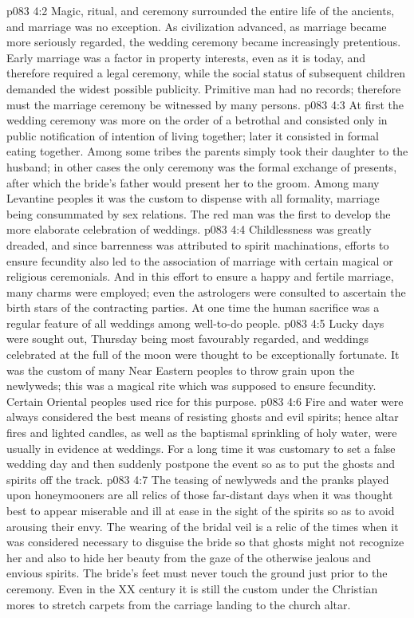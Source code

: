 \vs p083 4:2 \pc Magic, ritual, and ceremony surrounded the entire life of the ancients, and marriage was no exception. As civilization advanced, as marriage became more seriously regarded, the wedding ceremony became increasingly pretentious. Early marriage was a factor in property interests, even as it is today, and therefore required a legal ceremony, while the social status of subsequent children demanded the widest possible publicity. Primitive man had no records; therefore must the marriage ceremony be witnessed by many persons.
\vs p083 4:3 At first the wedding ceremony was more on the order of a betrothal and consisted only in public notification of intention of living together; later it consisted in formal eating together. Among some tribes the parents simply took their daughter to the husband; in other cases the only ceremony was the formal exchange of presents, after which the bride’s father would present her to the groom. Among many Levantine peoples it was the custom to dispense with all formality, marriage being consummated by sex relations. The red man was the first to develop the more elaborate celebration of weddings.
\vs p083 4:4 \pc Childlessness was greatly dreaded, and since barrenness was attributed to spirit machinations, efforts to ensure fecundity also led to the association of marriage with certain magical or religious ceremonials. And in this effort to ensure a happy and fertile marriage, many charms were employed; even the astrologers were consulted to ascertain the birth stars of the contracting parties. At one time the human sacrifice was a regular feature of all weddings among well\hyp{}to\hyp{}do people.
\vs p083 4:5 Lucky days were sought out, Thursday being most favourably regarded, and weddings celebrated at the full of the moon were thought to be exceptionally fortunate. It was the custom of many Near Eastern peoples to throw grain upon the newlyweds; this was a magical rite which was supposed to ensure fecundity. Certain Oriental peoples used rice for this purpose.
\vs p083 4:6 Fire and water were always considered the best means of resisting ghosts and evil spirits; hence altar fires and lighted candles, as well as the baptismal sprinkling of holy water, were usually in evidence at weddings. For a long time it was customary to set a false wedding day and then suddenly postpone the event so as to put the ghosts and spirits off the track.
\vs p083 4:7 The teasing of newlyweds and the pranks played upon honeymooners are all relics of those far\hyp{}distant days when it was thought best to appear miserable and ill at ease in the sight of the spirits so as to avoid arousing their envy. The wearing of the bridal veil is a relic of the times when it was considered necessary to disguise the bride so that ghosts might not recognize her and also to hide her beauty from the gaze of the otherwise jealous and envious spirits. The bride’s feet must never touch the ground just prior to the ceremony. Even in the XX century it is still the custom under the Christian mores to stretch carpets from the carriage landing to the church altar.

